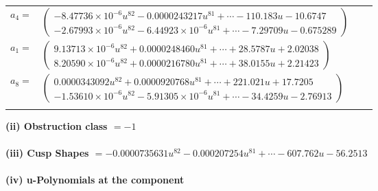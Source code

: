 \documentclass[1p]{elsarticle_modified}
\theoremstyle{definition}
\begin{document}
\begin{tabular}{m{7pt} m{180pt} m{7pt} m{180pt} }
\flushright $a_{4}=$&$\begin{pmatrix}-8.47736\times10^{-6} u^{82}-0.0000243217 u^{81}+\cdots-110.183 u-10.6747\\-2.67993\times10^{-6} u^{82}-6.44923\times10^{-6} u^{81}+\cdots-7.29709 u-0.675289\end{pmatrix}$ \\
\flushright $a_{1}=$&$\begin{pmatrix}9.13713\times10^{-6} u^{82}+0.0000248460 u^{81}+\cdots+28.5787 u+2.02038\\8.20590\times10^{-6} u^{82}+0.0000216780 u^{81}+\cdots+38.0155 u+2.21423\end{pmatrix}$ \\
\flushright $a_{8}=$&$\begin{pmatrix}0.0000343092 u^{82}+0.0000920768 u^{81}+\cdots+221.021 u+17.7205\\-1.53610\times10^{-6} u^{82}-5.91305\times10^{-6} u^{81}+\cdots-34.4259 u-2.76913\end{pmatrix}$\\&\end{tabular}
\flushleft \textbf{(ii) Obstruction class $= -1$}\\~\\
\flushleft \textbf{(iii) Cusp Shapes $= -0.0000735631 u^{82}-0.000207254 u^{81}+\cdots-607.762 u-56.2513$}\\~\\
\newpage\renewcommand{\arraystretch}{1}
\flushleft \textbf{(iv) u-Polynomials at the component}\newline \\
\end{document}

